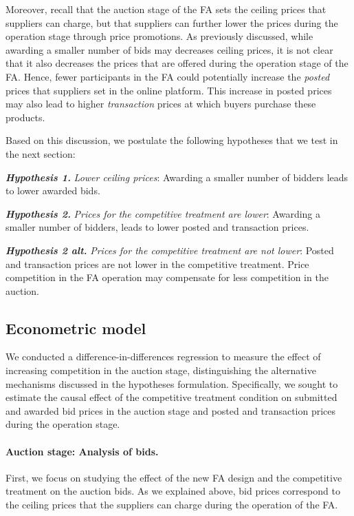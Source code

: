 Moreover, recall that the auction stage of the FA sets the ceiling prices that suppliers can charge, but that suppliers can further lower the prices during the operation stage through price promotions. As previously discussed, while awarding a smaller number of bids may decreases ceiling prices, it is not clear that it also decreases the prices that are offered during the operation stage of the FA. Hence, 
fewer participants in the FA could potentially increase the \textit{posted} prices that suppliers set in the online platform. This increase in posted prices may also lead to higher \textit{transaction} prices at which buyers purchase these products.

Based on this discussion, we postulate the following hypotheses that we test in the next section:
 
\noindent \textit{\bf Hypothesis 1.} \textit{Lower ceiling prices}: Awarding a smaller number of bidders leads to lower awarded bids.

\noindent \textit{\bf Hypothesis 2.} \textit{Prices for the competitive treatment are lower}: {Awarding a smaller number of bidders, leads to lower posted and transaction prices.} 

 \noindent \textit{\bf Hypothesis 2 alt.} \textit{Prices for the competitive treatment are \textit{not} lower}: {Posted and transaction prices are not lower in the competitive treatment. Price competition in the FA operation may compensate for less competition in the auction.}

 
\subsection{Econometric model}

We conducted a difference-in-differences regression to measure the effect of increasing competition in the auction stage, distinguishing the alternative mechanisms discussed in the hypotheses formulation. Specifically, we sought to estimate the causal effect of the competitive treatment condition on submitted and awarded bid prices in the auction stage and posted and transaction prices during the operation stage.

\paragraph{Auction stage: Analysis of bids.}
First, we focus on studying the effect of the new FA design and the competitive treatment on the auction bids. As we explained above, bid prices correspond to the ceiling prices that the suppliers can charge during the operation of the FA. 

